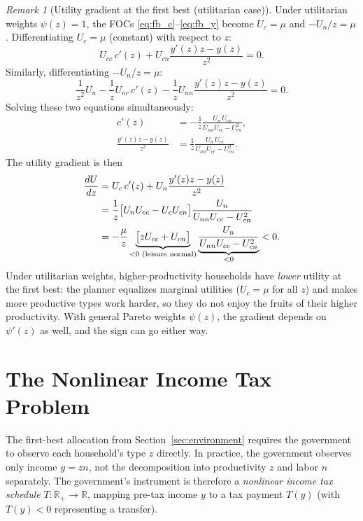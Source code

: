 \documentclass[12pt,a4paper]{article}
\theoremstyle{definition}
\theoremstyle{plain}
\theoremstyle{remark}
\newtheorem{remark}{Remark}[section]
\newcommand{\R}{\mathbb{R}}
\begin{document}
\begin{remark}[Utility gradient at the first best (utilitarian case)]
Under utilitarian weights $\psi(z) = 1$, the FOCs \eqref{eq:fb_c}--\eqref{eq:fb_y} become $U_c = \mu$ and $-U_n/z = \mu$. Differentiating $U_c = \mu$ (constant) with respect to $z$:
\[
  U_{cc} \, c'(z) + U_{cn} \frac{y'(z) z - y(z)}{z^2} = 0.
\]
Similarly, differentiating $-U_n/z = \mu$:
\[
  \frac{1}{z^2} U_n - \frac{1}{z} U_{nc} \, c'(z) - \frac{1}{z} U_{nn} \frac{y'(z) z - y(z)}{z^2} = 0.
\]
Solving these two equations simultaneously:
\begin{align*}
  c'(z) &= -\frac{1}{z} \frac{U_n \, U_{cn}}{U_{nn} U_{cc} - U_{cn}^2}, \\[4pt]
  \frac{y'(z) z - y(z)}{z^2} &= \frac{1}{z} \frac{U_n \, U_{cc}}{U_{nn} U_{cc} - U_{cn}^2}.
\end{align*}
The utility gradient is then
\begin{align}
  \frac{dU}{dz}
  &= U_c \, c'(z) + U_n \frac{y'(z)z - y(z)}{z^2} \notag \\
  &= \frac{1}{z} \bigl[ U_n U_{cc} - U_c U_{cn} \bigr] \frac{U_n}{U_{nn} U_{cc} - U_{cn}^2} \notag \\
  &= -\frac{\mu}{z}
    \underbrace{\bigl[ z U_{cc} + U_{cn} \bigr]}_{< 0 \text{ (leisure normal)}}
    \underbrace{\frac{U_n}{U_{nn} U_{cc} - U_{cn}^2}}_{< 0} < 0.
  \label{eq:fb_utility_gradient}
\end{align}
Under utilitarian weights, higher-productivity households have \emph{lower} utility at the first best: the planner equalizes marginal utilities ($U_c = \mu$ for all $z$) and makes more productive types work harder, so they do not enjoy the fruits of their higher productivity. With general Pareto weights $\psi(z)$, the gradient depends on $\psi'(z)$ as well, and the sign can go either way.

\end{remark}
\section{The Nonlinear Income Tax Problem}
\label{sec:tax_problem}

The first-best allocation from Section~\ref{sec:environment} requires the government to observe each household's type $z$ directly. In practice, the government observes only income $y = zn$, not the decomposition into productivity $z$ and labor $n$ separately. The government's instrument is therefore a \emph{nonlinear income tax schedule} $T: \R_+ \to \R$, mapping pre-tax income $y$ to a tax payment $T(y)$ (with $T(y) < 0$ representing a transfer).
\end{document}
